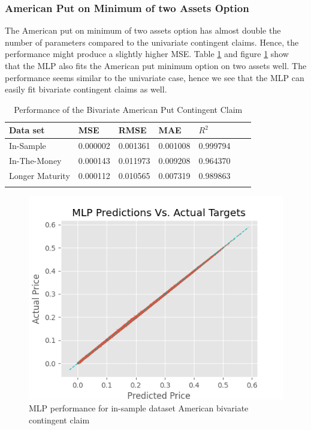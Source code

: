 \subsubsection{American Put on Minimum of two Assets Option}
The American put on minimum of two assets option has almost double the number of parameters compared to the univariate contingent claims. Hence, the performance might produce a slightly higher MSE. Table \ref{tab:AmerMinPerformanceComparision} and figure \ref{fig:MLPInSampleAmerMin} show that the MLP also fits the American put minimum option on two assets well. The performance seems similar to the univariate case, hence we see that the MLP can easily fit bivariate contingent claims as well. \\ 

\begin{table}[th]
\caption{Performance of the Bivariate American Put Contingent Claim}
\label{tab:AmerMinPerformanceComparision}
\centering
\begin{tabular}{l l l l l l l }
\toprule
\textbf{Data set} & \textbf{MSE} & \textbf{RMSE} & \textbf{MAE} & \textbf{$R^2$} \\
\midrule
In-Sample & 0.000002 & 0.001361 & 0.001008 & 0.999794\\
In-The-Money & 0.000143 & 0.011973 & 0.009208 & 0.964370\\
Longer Maturity & 0.000112 & 0.010565 & 0.007319 & 0.989863\\
\bottomrule\\
\end{tabular}
\end{table}

\begin{figure}[H]
\centering
\includegraphics{Figures/inSampleAmerMinP.png}
\decoRule
\caption[MLP Performance for In-sample Dataset American Put on minimum on two Assets]{MLP performance for in-sample dataset American bivariate contingent claim}
\label{fig:MLPInSampleAmerMin}
\end{figure}

